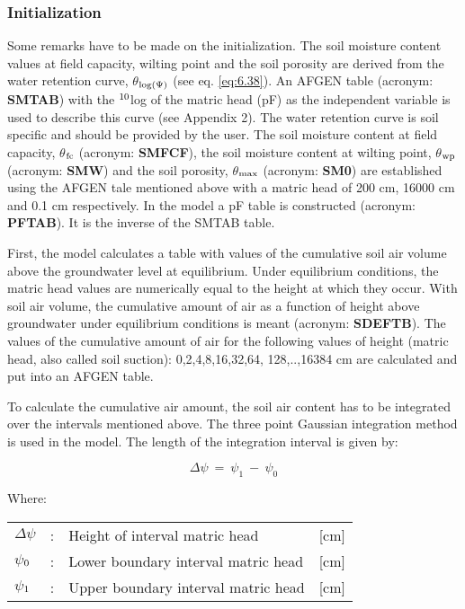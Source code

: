 \subsubsection{Initialization}
Some remarks have to be made on the initialization. The soil moisture content values at
field capacity, wilting point and the soil porosity are derived from the water retention
curve, $\theta$$_{{\rm log(}{\rm \Psi}{)}}$ (see eq. \ref{eq:6.38}). An AFGEN table (acronym: 
{\bf SMTAB}) with the $^{{\rm 10}}$log of the
matric head (pF) as the independent variable is used to describe this curve (see Appendix
2). The water retention curve is soil specific and should be provided by the user. The soil
moisture content at field capacity, {\bf $\theta$$_{{\rm fc}}$} (acronym: {\bf SMFCF}), 
the soil moisture content at
wilting point, {\bf $\theta$$_{{\rm wp}}$} (acronym: {\bf SMW}) and the soil porosity, 
{\bf $\theta$$_{{\rm max}}$} (acronym: {\bf SM0}) are
established using the AFGEN tale mentioned above with a matric head of 200 cm, 16000
cm and 0.1 cm respectively. In the model a pF table is constructed (acronym: {\bf PFTAB}).
It is the inverse of the SMTAB table.

First, the model calculates a table with values of the cumulative soil air volume above the
groundwater level at equilibrium. Under equilibrium conditions, the matric head values
are numerically equal to the height at which they occur. With soil air volume, the
cumulative amount of air as a function of height above groundwater under equilibrium
conditions is meant (acronym: {\bf SDEFTB}). The values of the cumulative amount of air for
the following values of height (matric head, also called soil suction): 0,2,4,8,16,32,64,
128,..,16384 cm are calculated and put into an AFGEN table. 

To calculate the cumulative air amount, the soil air content has to be integrated over the
intervals mentioned above. The three point Gaussian integration method is used in the
model. The length of the integration interval is given by:

\begin{equation}
\label{eq:6.35}
\Delta  \psi ~=~ \psi _{1} ~-~ \psi _{0} 
\end{equation}

Where:\\[5pt]
\begin{tabularx}{\textwidth}{llXr}
$\Delta$$\psi$ &:& Height of interval matric head  & [cm]\\
$\psi$$_{{\rm 0}}$ &:& Lower boundary interval matric head  & [cm]\\
$\psi$$_{{\rm 1}}$ &:& Upper boundary interval matric head  & [cm]\\
\end{tabularx}

